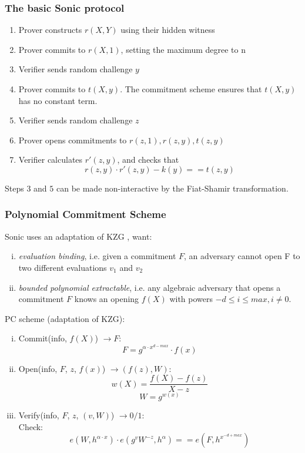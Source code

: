 \documentclass{article}
\theoremstyle{definition}
\begin{document}
\subsubsection{The basic Sonic protocol}

\begin{enumerate}[1.]
    \item Prover constructs $r(X, Y)$ using their hidden witness
    \item Prover commits to $r(X, 1)$, setting the maximum degree to n
    \item Verifier sends random challenge $y$
    \item Prover commits to $t(X, y)$. The commitment scheme ensures that $t(X, y)$ has no constant term.
    \item Verifier sends random challenge $z$
    \item Prover opens commitments to $r(z, 1), r(z, y), t(z, y)$
    \item Verifier calculates $r'(z, y)$, and checks that
	$$r(z, y) \cdot r'(z, y) - k(y) == t(z, y)$$
\end{enumerate}

Steps $3$ and $5$ can be made non-interactive by the Fiat-Shamir transformation.

\subsubsection{Polynomial Commitment Scheme}
Sonic uses an adaptation of KZG \cite{kzg-tmp}, want:

\begin{enumerate}[i.]
    \item \emph{evaluation binding}, i.e. given a commitment $F$, an adversary cannot open F to two different evaluations $v_1$ and $v_2$
    \item \emph{bounded polynomial extractable}, i.e. any algebraic adversary that opens a commitment $F$ knows an opening $f(X)$ with powers $-d \leq i \leq max, i \neq 0$.
\end{enumerate}

\vspace{0.5cm}
PC scheme (adaptation of KZG):

\begin{enumerate}[i.]
    \item Commit(info, $f(X)$) $\longrightarrow F$:
	$$F = g^{\alpha \cdot x^{d-max}} \cdot f(x)$$
    \item Open(info, $F$, $z$, $f(x)$) $\longrightarrow (f(z), W)$:
	$$w(X) = \frac{f(X) - f(z)}{X-z}$$
	$$W = g^{w(x)}$$
    \item Verify(info, $F$, $z$, $(v, W)$) $\longrightarrow 0/1$:\\
	Check:
	$$e(W, h^{\alpha \cdot x}) \cdot
	e(g^v W^{-z}, h^{\alpha})
	== e(F, h^{x^{-d+max}})$$
\end{enumerate}
\end{document}
